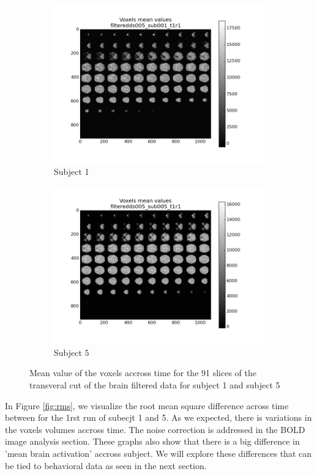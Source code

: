\begin{figure}[H]
\begin{subfigure}{.5\textwidth}
  \centering
  \includegraphics[width=.9\linewidth]{../fig/BOLD/filteredds005_sub001_t1r1_mean_voxels.png}
  \caption{Subject 1}
  \label{fig:mosaic2a}
\end{subfigure}%
\begin{subfigure}{.5\textwidth}
  \centering
  \includegraphics[width=.9\linewidth]{../fig/BOLD/filteredds005_sub005_t1r1_mean_voxels.png}
  \caption{Subject 5}
  \label{fig:mosaic2b}
\end{subfigure}
\caption{Mean value of the voxels accross time for the 91 slices of the transveral cut
         of the brain filtered data for subject 1 and subject 5}
\label{fig:moisaic2}
\end{figure}

\noindent
\par In Figure \ref{fig:rms}, we visualize the root mean square difference across
time between for the 1rst run of subecjt 1 and 5. 
As we expected, there is variations in the voxels volumes accross time. The noise 
correction is addressed in the BOLD image analysis section. These graphs also show that
there is a big difference in 'mean brain activation' accross subject. We will explore these
differences that can be tied to behavioral data as seen in the next section.

